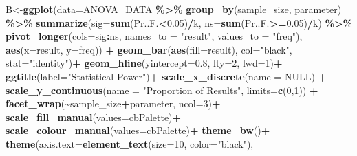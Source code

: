 \documentclass[
]{article}
\newenvironment{Shaded}{\begin{snugshade}}{\end{snugshade}}
\newcommand{\AttributeTok}[1]{\textcolor[rgb]{0.13,0.29,0.53}{#1}}
\newcommand{\ConstantTok}[1]{\textcolor[rgb]{0.56,0.35,0.01}{#1}}
\newcommand{\DecValTok}[1]{\textcolor[rgb]{0.00,0.00,0.81}{#1}}
\newcommand{\FloatTok}[1]{\textcolor[rgb]{0.00,0.00,0.81}{#1}}
\newcommand{\FunctionTok}[1]{\textcolor[rgb]{0.13,0.29,0.53}{\textbf{#1}}}
\newcommand{\NormalTok}[1]{#1}
\newcommand{\OtherTok}[1]{\textcolor[rgb]{0.56,0.35,0.01}{#1}}
\newcommand{\SpecialCharTok}[1]{\textcolor[rgb]{0.81,0.36,0.00}{\textbf{#1}}}
\newcommand{\StringTok}[1]{\textcolor[rgb]{0.31,0.60,0.02}{#1}}
\begin{document}
\begin{Shaded}
\begin{Highlighting}[]
\NormalTok{B}\OtherTok{\textless{}{-}}\FunctionTok{ggplot}\NormalTok{(}\AttributeTok{data=}\NormalTok{ANOVA\_DATA }\SpecialCharTok{\%\textgreater{}\%} \FunctionTok{group\_by}\NormalTok{(sample\_size, parameter) }\SpecialCharTok{\%\textgreater{}\%}
         \FunctionTok{summarize}\NormalTok{(}\AttributeTok{sig=}\FunctionTok{sum}\NormalTok{(Pr..F.}\SpecialCharTok{\textless{}}\FloatTok{0.05}\NormalTok{)}\SpecialCharTok{/}\NormalTok{k,}
                   \AttributeTok{ns=}\FunctionTok{sum}\NormalTok{(Pr..F.}\SpecialCharTok{\textgreater{}=}\FloatTok{0.05}\NormalTok{)}\SpecialCharTok{/}\NormalTok{k) }\SpecialCharTok{\%\textgreater{}\%} 
         \FunctionTok{pivot\_longer}\NormalTok{(}\AttributeTok{cols=}\NormalTok{sig}\SpecialCharTok{:}\NormalTok{ns, }\AttributeTok{names\_to =} \StringTok{"result"}\NormalTok{, }\AttributeTok{values\_to =} \StringTok{"freq"}\NormalTok{),}
       \FunctionTok{aes}\NormalTok{(}\AttributeTok{x=}\NormalTok{result, }\AttributeTok{y=}\NormalTok{freq)) }\SpecialCharTok{+}
  \FunctionTok{geom\_bar}\NormalTok{(}\FunctionTok{aes}\NormalTok{(}\AttributeTok{fill=}\NormalTok{result), }\AttributeTok{col=}\StringTok{"black"}\NormalTok{, }\AttributeTok{stat=}\StringTok{"identity"}\NormalTok{)}\SpecialCharTok{+}
  \FunctionTok{geom\_hline}\NormalTok{(}\AttributeTok{yintercept=}\FloatTok{0.8}\NormalTok{, }\AttributeTok{lty=}\DecValTok{2}\NormalTok{, }\AttributeTok{lwd=}\DecValTok{1}\NormalTok{)}\SpecialCharTok{+}
  \FunctionTok{ggtitle}\NormalTok{(}\AttributeTok{label=}\StringTok{"Statistical Power"}\NormalTok{)}\SpecialCharTok{+}
  \FunctionTok{scale\_x\_discrete}\NormalTok{(}\AttributeTok{name =} \ConstantTok{NULL}\NormalTok{) }\SpecialCharTok{+}
  \FunctionTok{scale\_y\_continuous}\NormalTok{(}\AttributeTok{name =} \StringTok{"Proportion of Results"}\NormalTok{, }\AttributeTok{limits=}\FunctionTok{c}\NormalTok{(}\DecValTok{0}\NormalTok{,}\DecValTok{1}\NormalTok{)) }\SpecialCharTok{+}
  \FunctionTok{facet\_wrap}\NormalTok{(}\SpecialCharTok{\textasciitilde{}}\NormalTok{sample\_size}\SpecialCharTok{+}\NormalTok{parameter, }\AttributeTok{ncol=}\DecValTok{3}\NormalTok{)}\SpecialCharTok{+}
  \FunctionTok{scale\_fill\_manual}\NormalTok{(}\AttributeTok{values=}\NormalTok{cbPalette)}\SpecialCharTok{+}
  \FunctionTok{scale\_colour\_manual}\NormalTok{(}\AttributeTok{values=}\NormalTok{cbPalette)}\SpecialCharTok{+}
  \FunctionTok{theme\_bw}\NormalTok{()}\SpecialCharTok{+}
  \FunctionTok{theme}\NormalTok{(}\AttributeTok{axis.text=}\FunctionTok{element\_text}\NormalTok{(}\AttributeTok{size=}\DecValTok{10}\NormalTok{, }\AttributeTok{color=}\StringTok{"black"}\NormalTok{),}

\end{Highlighting}
\end{Shaded}
\end{document}
